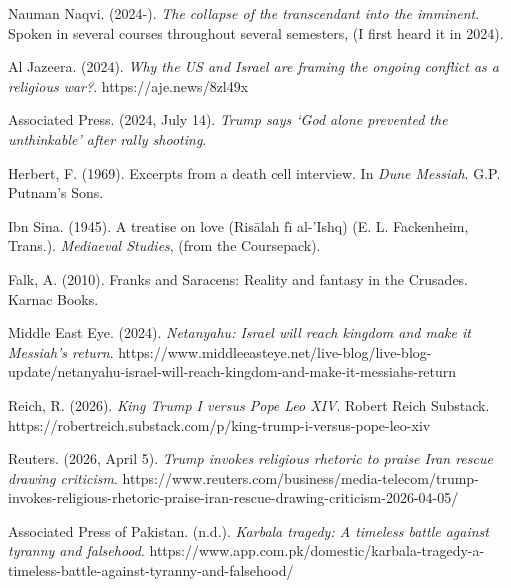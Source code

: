 \documentclass[12pt]{article}
\begin{document}
\begin{list}{}{
  \setlength{\leftmargin}{0.5in}
  \setlength{\itemindent}{-0.5in}
  \setlength{\parsep}{\parskip}
}
\item Nauman Naqvi. (2024-). \textit{The collapse of the transcendant into the imminent}. Spoken in several courses throughout several semesters, (I first heard it in 2024).

\item Al Jazeera. (2024). \textit{Why the US and Israel are framing the ongoing conflict as a religious war?}. https://aje.news/8zl49x

\item Associated Press. (2024, July 14). \textit{Trump says `God alone prevented the unthinkable' after rally shooting}. 

\item Herbert, F. (1969). Excerpts from a death cell interview. In \textit{Dune Messiah}. G.P. Putnam's Sons.

\item Ibn Sina. (1945). A treatise on love (Ris\={a}lah f\={\i} al-'Ishq) (E. L. Fackenheim, Trans.). \textit{Mediaeval Studies}, (from the Coursepack).

\item Falk, A. (2010). Franks and Saracens: Reality and fantasy in the Crusades. Karnac Books.

\item Middle East Eye. (2024). \textit{Netanyahu: Israel will reach kingdom and make it Messiah's return}. https://www.middleeasteye.net/live-blog/live-blog-update/netanyahu-israel-will-reach-kingdom-and-make-it-messiahs-return

\item Reich, R. (2026). \textit{King Trump I versus Pope Leo XIV}. Robert Reich Substack. https://robertreich.substack.com/p/king-trump-i-versus-pope-leo-xiv

\item Reuters. (2026, April 5). \textit{Trump invokes religious rhetoric to praise Iran rescue drawing criticism}. https://www.reuters.com/business/media-telecom/trump-invokes-religious-rhetoric-praise-iran-rescue-drawing-criticism-2026-04-05/

\item Associated Press of Pakistan. (n.d.). \textit{Karbala tragedy: A timeless battle against tyranny and falsehood}. https://www.app.com.pk/domestic/karbala-tragedy-a-timeless-battle-against-tyranny-and-falsehood/

\end{list}
\end{document}
